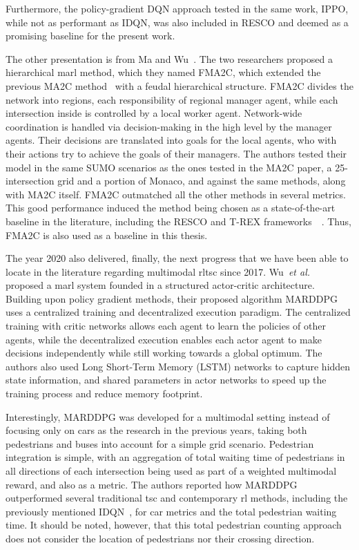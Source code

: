 Furthermore, the policy-gradient DQN approach tested in the same work, IPPO, while not as performant as IDQN, was also included in RESCO and deemed as a promising baseline for the present work.

The other presentation is from Ma and Wu~\cite{Ma2020}. The two researchers proposed a hierarchical \gls{marl} method, which they named FMA2C, which extended the previous MA2C method~\cite{Chu2019} with a feudal hierarchical structure. FMA2C divides the network into regions, each responsibility of regional manager agent, while each intersection inside is controlled by a local worker agent. Network-wide coordination is handled via decision-making in the high level by the manager agents. Their decisions are translated into goals for the local agents, who with their actions try to achieve the goals of their managers. The authors tested their model in the same SUMO scenarios as the ones tested in the MA2C paper, a 25-intersection grid and a portion of Monaco, and against the same methods, along with MA2C itself. FMA2C outmatched all the other methods in several metrics. This good performance induced the method being chosen as a state-of-the-art baseline in the literature, including the RESCO and T-REX frameworks~\cite{Ault2021}~\cite{Nguyen2025}. Thus, FMA2C is also used as a baseline in this thesis.

\medskip

\noindent The year 2020 also delivered, finally, the next progress that we have been able to locate in the literature regarding multimodal \gls{rltsc} since 2017. Wu~\textit{et al.}~\cite{Wu2020} proposed a \gls{marl} system founded in a structured actor-critic architecture. Building upon policy gradient methods, their proposed algorithm MARDDPG uses a centralized training and decentralized execution paradigm. The centralized training with critic networks allows each agent to learn the policies of other agents, while the decentralized execution enables each actor agent to make decisions independently while still working towards a global optimum. The authors also used Long Short-Term Memory (LSTM) networks to capture hidden state information, and shared parameters in actor networks to speed up the training process and reduce memory footprint. 

Interestingly, MARDDPG was developed for a multimodal setting instead of focusing only on cars as the research in the previous years, taking both pedestrians and buses into account for a simple grid scenario. Pedestrian integration is simple, with an aggregation of total waiting time of pedestrians in all directions of each intersection being used as part of a weighted multimodal reward, and also as a metric. The authors reported how MARDDPG outperformed several traditional \gls{tsc} and contemporary \gls{rl} methods, including the previously mentioned IDQN~\cite{Ault2019}, for car metrics and the total pedestrian waiting time. It should be noted, however, that this total pedestrian counting approach does not consider the location of pedestrians nor their crossing direction.

